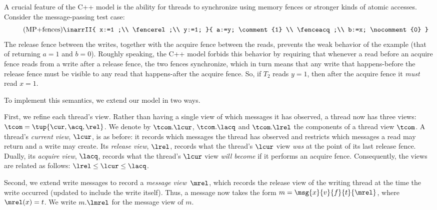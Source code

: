 A crucial feature of the C++ model is the ability for threads to synchronize using memory fences or stronger kinds of atomic accesses.
Consider the message-passing test case:
\begin{equation}\label{eq:MPfences}\tag{MP+fences}
\inarrII{ x:=1 ;\\ \fencerel ;\\ y:=1; }{  a:=y; \comment{1} \\ \fenceacq;\\ b:=x; \nocomment{0} }
\end{equation}
The release fence between the writes, together with the acquire fence
between the reads, prevents the weak behavior of the example (\ie that
of returning $a=1$ and $b=0$).  Roughly speaking, the C++ model
forbids this behavior by requiring that whenever a read before an
acquire fence reads from a write after a release fence, the two fences
synchronize, which in turn means that any write that happens-before the release
fence must be visible to any read that happens-after the acquire fence.  So, if $T_2$
reads $y=1$, then after the acquire fence it \emph{must} read $x=1$.


To implement this semantics, we extend our model in two ways.

First, we refine each thread's view.  Rather than having a single view
of which messages it has observed, a thread now has three views:
$\tcom=\tup{\cur,\acq,\rel}$.  We denote by $\tcom.\lcur$,
$\tcom.\lacq$ and $\tcom.\lrel$ the components of a thread view
$\tcom$.  A thread's \emph{current view}, $\lcur$, is as before: it records
which messages the thread has observed and restricts which messages a
read may return and a write may create.  Its \emph{release view}, $\lrel$,
records what the thread's $\lcur$ view \emph{was} at the point of its
last release fence.
Dually, its \emph{acquire view}, $\lacq$, records what the thread's $\lcur$
view \emph{will become} if it performs an acquire fence.
Consequently, the views are related as follows:
$\lrel \leq \lcur \leq \lacq$.

Second, we extend write messages to record a \emph{message
  view}~$\mrel$, which records the release view of the writing thread
at the time the write occurred (updated to include the write itself).
Thus, a message now takes the form $m=\msg{x}{v}{f}{t}{\mrel}$, where
$\mrel(x) = t$.  We write $m.\lmrel$ for the message view of $m$.

